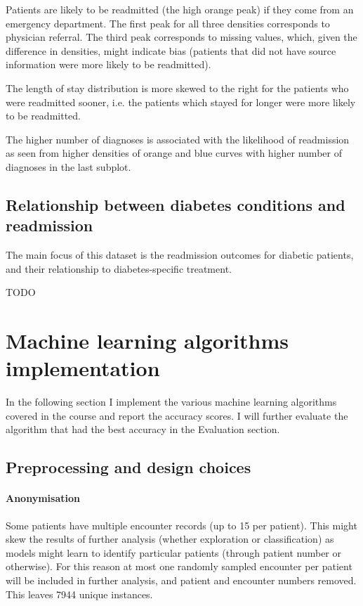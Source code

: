 \documentclass[10pt, twocolumn]{article}
\begin{document}
Patients are likely to be readmitted (the high orange peak) if they come from an emergency department. The first peak for all three densities corresponds to physician referral. The third peak corresponds to missing values, which, given the difference in densities, might indicate bias (patients that did not have source information were more likely to be readmitted).

The length of stay distribution is more skewed to the right for the patients who were readmitted sooner, i.e. the patients which stayed for longer were more likely to be readmitted.

The higher number of diagnoses is associated with the likelihood of readmission as seen from higher densities of orange and blue curves with higher number of diagnoses in the last subplot.


\subsection{Relationship between diabetes conditions and readmission}
The main focus of this dataset is the readmission outcomes for diabetic patients, and their relationship to diabetes-specific treatment.

\LARGE{TODO}

\normalsize

\section{Machine learning algorithms implementation}

In the following section I implement the various machine learning algorithms covered in the course and report the accuracy scores. I will further evaluate the algorithm that had the best accuracy in the Evaluation section.

\subsection{Preprocessing and design choices}

\paragraph{Anonymisation} Some patients have multiple encounter records (up to 15 per patient). This might skew the results of further analysis (whether exploration or classification) as models might learn to identify particular patients (through patient number or otherwise). For this reason at most one randomly sampled encounter per patient will be included in further analysis, and patient and encounter numbers removed. This leaves 7944 unique instances.
\end{document}
